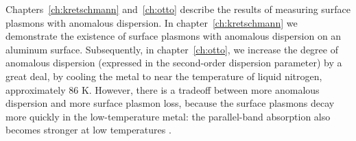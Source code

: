 Chapters~\ref{ch:kretschmann} and~\ref{ch:otto} describe the results of measuring surface plasmons with anomalous dispersion.
In chapter~\ref{ch:kretschmann} we demonstrate the existence of surface plasmons with anomalous dispersion on an aluminum surface.
Subsequently, in chapter~\ref{ch:otto}, we increase the degree of anomalous dispersion (expressed in the second-order dispersion parameter) by a great deal, by cooling the metal to near the temperature of liquid nitrogen, approximately 86 K.
However, there is a tradeoff between more anomalous dispersion and more surface plasmon loss, because the surface plasmons decay more quickly in the low-temperature metal: the parallel-band absorption also becomes stronger at low temperatures \cite{Liljenvall1971,Mathewson1972a}.
